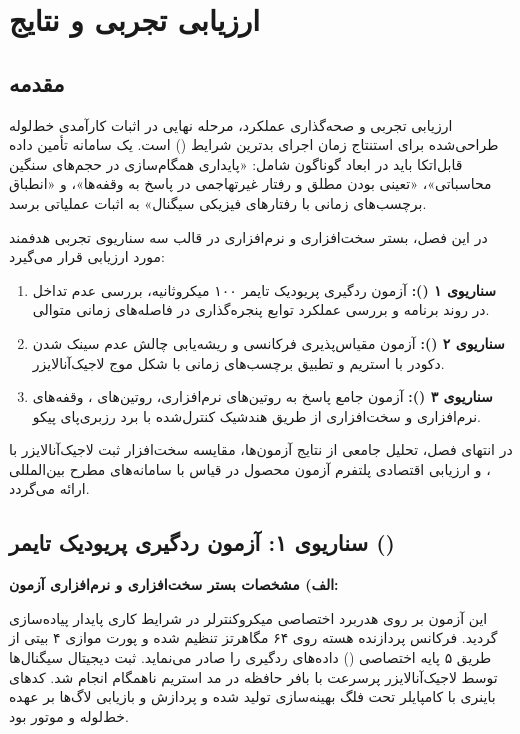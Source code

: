 
\chapter{ارزیابی تجربی و نتایج}
\label{ch:evaluation}

\section{مقدمه}
ارزیابی تجربی و صحه‌گذاری عملکرد، مرحله نهایی در اثبات کارآمدی خط‌لوله طراحی‌شده برای استنتاج زمان اجرای بدترین شرایط () است. یک سامانه تأمین داده قابل‌اتکا باید در ابعاد گوناگون شامل: «پایداری همگام‌سازی در حجم‌های سنگین محاسباتی»، «تعینی بودن مطلق و رفتار غیرتهاجمی در پاسخ به وقفه‌ها»، و «انطباق برچسب‌های زمانی با رفتارهای فیزیکی سیگنال» به اثبات عملیاتی برسد.

در این فصل، بستر سخت‌افزاری و نرم‌افزاری در قالب سه سناریوی تجربی هدفمند مورد ارزیابی قرار می‌گیرد:
\begin{enumerate}
    \item \textbf{سناریوی ۱ ():} آزمون ردگیری پریودیک تایمر ۱۰۰ میکروثانیه، بررسی عدم تداخل  در روند برنامه و بررسی عملکرد توابع پنجره‌گذاری در فاصله‌های زمانی متوالی.
    \item \textbf{سناریوی ۲ ():} آزمون مقیاس‌پذیری فرکانسی و ریشه‌یابی چالش عدم سینک شدن دکودر با استریم  و تطبیق برچسب‌های زمانی با شکل موج لاجیک‌آنالایزر.
    \item \textbf{سناریوی ۳ ():} آزمون جامع پاسخ به روتین‌های نرم‌افزاری، روتین‌های ، وقفه‌های نرم‌افزاری و سخت‌افزاری از طریق هندشیک کنترل‌شده با برد رزبری‌پای پیکو.
\end{enumerate}
در انتهای فصل، تحلیل جامعی از نتایج آزمون‌ها، مقایسه سخت‌افزار ثبت لاجیک‌آنالایزر با ، و ارزیابی اقتصادی پلتفرم آزمون محصول در قیاس با سامانه‌های مطرح بین‌المللی ارائه می‌گردد.

\section{سناریوی ۱: آزمون ردگیری پریودیک تایمر ()}
\label{sec:test_timertest}

\noindent
\textbf{الف) مشخصات بستر سخت‌افزاری و نرم‌افزاری آزمون:}\par
این آزمون بر روی هدربرد اختصاصی میکروکنترلر  در شرایط کاری پایدار پیاده‌سازی گردید. فرکانس پردازنده هسته روی ۶۴ مگاهرتز تنظیم شده و پورت موازی ۴ بیتی  از طریق ۵ پایه اختصاصی () داده‌های ردگیری را صادر می‌نماید. ثبت دیجیتال سیگنال‌ها توسط لاجیک‌آنالایزر پرسرعت  با بافر حافظه  در مد استریم ناهمگام انجام شد. کدهای باینری با کامپایلر  تحت فلگ بهینه‌سازی  تولید شده و پردازش و بازیابی لاگ‌ها بر عهده خط‌لوله  و موتور  بود.

